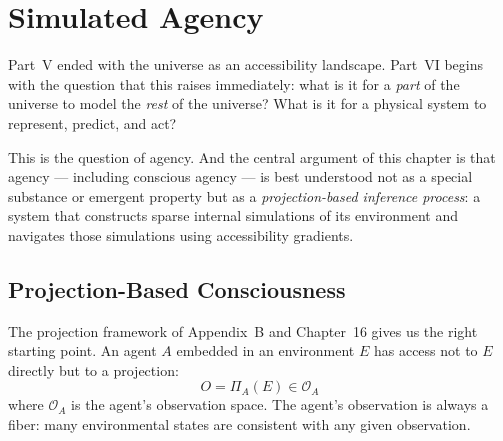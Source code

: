 
\chapter{Simulated Agency}



Part~V ended with the universe as an accessibility landscape. Part~VI begins
with the question that this raises immediately: what is it for a \emph{part}
of the universe to model the \emph{rest} of the universe? What is it for a
physical system to represent, predict, and act?

This is the question of agency. And the central argument of this chapter
is that agency — including conscious agency — is best understood not as a
special substance or emergent property but as a \emph{projection-based
inference process}: a system that constructs sparse internal simulations
of its environment and navigates those simulations using accessibility
gradients.

\section{Projection-Based Consciousness}

The projection framework of Appendix~B and Chapter~16 gives us the
right starting point. An agent $A$ embedded in an environment $E$ has
access not to $E$ directly but to a projection:
\[
  O = \Pi_A(E) \in \mathcal{O}_A
\]
where $\mathcal{O}_A$ is the agent's observation space. The agent's
observation is always a fiber: many environmental states are consistent
with any given observation.

